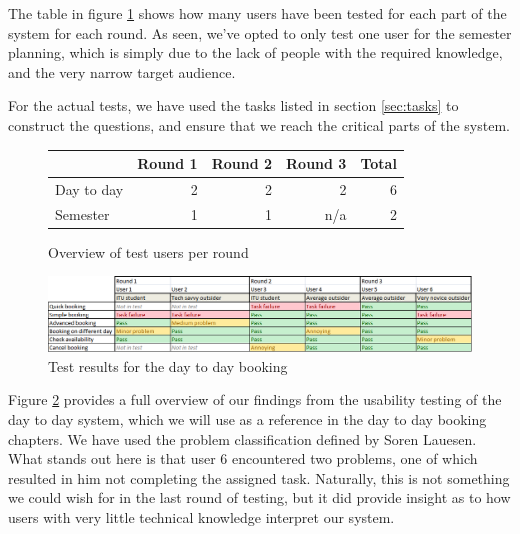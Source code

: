 The table in figure \ref{fig:usa_users} shows how many users have been tested for each part of the system for each round. As seen, we've opted to only test one user for the semester planning, which is simply due to the lack of people with the required knowledge, and the very narrow target audience.

For the actual tests, we have used the tasks listed in section \ref{sec:tasks} to construct the questions, and ensure that we reach the critical parts of the system.

\begin{figure}[htb]
\begin{center}
\leavevmode
	\begin{tabular}{|l|r|r|r||r|}
		\hline
		 & Round 1 & Round 2 & Round 3 & Total \\ \hline
		Day to day & 2 & 2 & 2 & 6\\ \hline
		Semester & 1 & 1 & n/a & 2 \\ \hline
	\end{tabular}
\end{center}
\caption{Overview of test users per round}
\label{fig:usa_users}
\end{figure}

\begin{figure}[htb]
\begin{center}
\leavevmode
\includegraphics[width=1\textwidth]{images/result_day}
\end{center}
\caption{Test results for the day to day booking}
\label{fig:results_day}
\end{figure}

Figure \ref{fig:results_day} provides a full overview of our findings from the usability testing of the day to day system, which we will use as a reference in the day to day booking chapters. We have used the problem classification defined by Soren Lauesen\cite{lauesen}.\\
What stands out here is that user 6 encountered two problems, one of which resulted in him not completing the assigned task. Naturally, this is not something we could wish for in the last round of testing, but it did provide insight as to how users with very little technical knowledge interpret our system.

